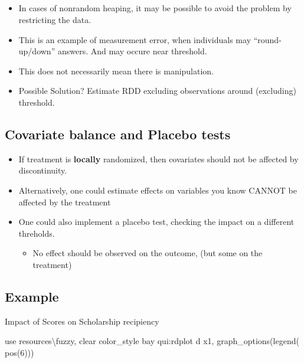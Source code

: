 \documentclass[
  letterpaper,
  DIV=11,
  numbers=noendperiod]{scrartcl}
\newenvironment{Shaded}{\begin{snugshade}}{\end{snugshade}}
\newcommand{\BaseNTok}[1]{\textcolor[rgb]{0.68,0.00,0.00}{#1}}
\newcommand{\KeywordTok}[1]{\textcolor[rgb]{0.00,0.23,0.31}{#1}}
\newcommand{\NormalTok}[1]{\textcolor[rgb]{0.00,0.23,0.31}{#1}}
\providecommand{\tightlist}{%
  \setlength{\itemsep}{0pt}\setlength{\parskip}{0pt}}\usepackage{longtable,booktabs,array}
\begin{document}
\subsection{}\label{section-2}

\begin{itemize}
\item
  In cases of nonrandom heaping, it may be possible to avoid the problem
  by restricting the data.
\item
  This is an example of measurement error, when individuals may
  ``round-up/down'' answers. And may occure near threshold.
\item
  This does not necessarily mean there is manipulation.
\item
  Possible Solution? Estimate RDD excluding observations around
  (excluding) threshold.
\end{itemize}

\subsection{Covariate balance and Placebo
tests}\label{covariate-balance-and-placebo-tests}

\begin{itemize}
\item
  If treatment is \textbf{locally} randomized, then covariates should
  not be affected by discontinuity.
\item
  Alternatively, one could estimate effects on variables you know CANNOT
  be affected by the treatment
\item
  One could also implement a placebo test, checking the impact on a
  different threholds.

  \begin{itemize}
  \tightlist
  \item
    No effect should be observed on the outcome, (but some on the
    treatment)
  \end{itemize}
\end{itemize}

\subsection{Example}\label{example-3}

Impact of Scores on Scholarship recipiency

\begin{Shaded}
\begin{Highlighting}[]
\KeywordTok{use}\NormalTok{ resources\textbackslash{}fuzzy, }\KeywordTok{clear}
\NormalTok{color\_style bay}
\KeywordTok{qui}\NormalTok{:rdplot }\KeywordTok{d}\NormalTok{ x1, graph\_options(}\BaseNTok{legend}\NormalTok{( pos(6)))}
\end{Highlighting}
\end{Shaded}
\end{document}
